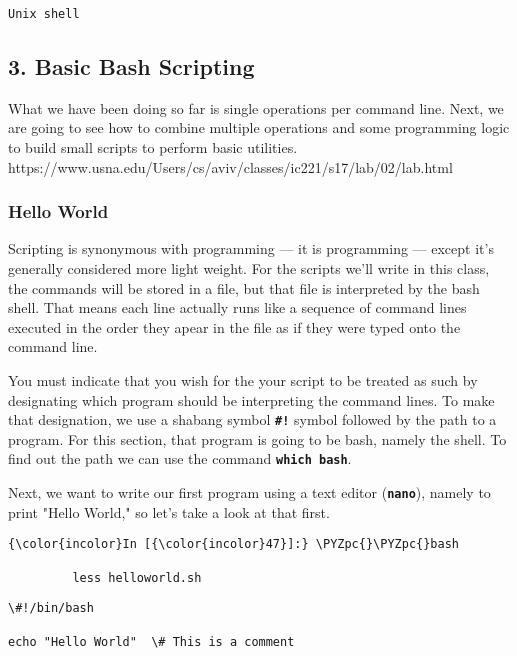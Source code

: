 \documentclass[11pt]{article}
\def\PYZpc{\char`\%}
\begin{document}
    \begin{Verbatim}[commandchars=\\\{\}]
Unix shell

    \end{Verbatim}

    \subsection{3. Basic Bash Scripting}\label{basic-bash-scripting}

What we have been doing so far is single operations per command line.
Next, we are going to see how to combine multiple operations and some
programming logic to build small scripts to perform basic utilities.
https://www.usna.edu/Users/cs/aviv/classes/ic221/s17/lab/02/lab.html

    \subsubsection{Hello World}\label{hello-world}

    Scripting is synonymous with programming --- it is programming ---
except it's generally considered more light weight. For the scripts
we'll write in this class, the commands will be stored in a file, but
that file is interpreted by the bash shell. That means each line
actually runs like a sequence of command lines executed in the order
they apear in the file as if they were typed onto the command line.

You must indicate that you wish for the your script to be treated as
such by designating which program should be interpreting the command
lines. To make that designation, we use a shabang symbol
\textbf{\texttt{\#!}} symbol followed by the path to a program. For this
section, that program is going to be bash, namely the shell. To find out
the path we can use the command \textbf{\texttt{which\ bash}}.

Next, we want to write our first program using a text editor
(\textbf{\texttt{nano}}), namely to print "Hello World," so let's take a
look at that first.

    \begin{Verbatim}[commandchars=\\\{\}]
{\color{incolor}In [{\color{incolor}47}]:} \PYZpc{}\PYZpc{}bash
         
         less helloworld.sh
\end{Verbatim}


    \begin{Verbatim}[commandchars=\\\{\}]
\#!/bin/bash

echo "Hello World"  \# This is a comment


    \end{Verbatim}
\end{document}
